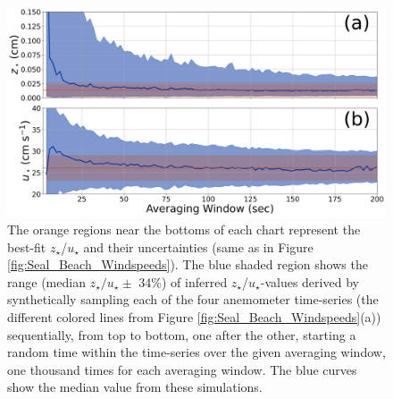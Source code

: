 \documentclass[linenumbers]{aastex631}
\begin{document}
\begin{figure}
    \centering
    \includegraphics[width=\textwidth]{figures and data/synthetic_terrestrial_wind_profile.jpg}
    \caption{The orange regions near the bottoms of each chart represent the best-fit $z_\star$/$u_\star$ and their uncertainties (same as in Figure \ref{fig:Seal_Beach_Windspeeds}). The blue shaded region shows the range (median $z_\star/u_\star \pm$ 34\%) of inferred $z_\star$/$u_\star$-values derived by synthetically sampling each of the four anemometer time-series (the different colored lines from Figure \ref{fig:Seal_Beach_Windspeeds}(a)) sequentially, from top to bottom, one after the other, starting a random time within the time-series over the given averaging window, one thousand times for each averaging window. The blue curves show the median value from these simulations.}
    \label{fig:synthetic_terrestrial_wind_profile}
\end{figure}
\end{document}
